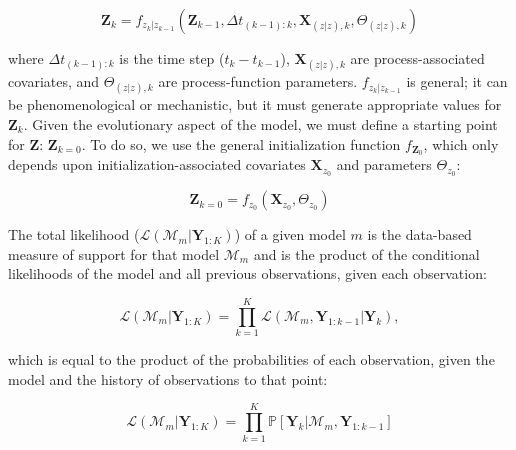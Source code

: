 \documentclass{article}
\begin{document}
\begin{equation}
\textbf{Z}_{k} = f_{z_k|z_{k-1}}(\textbf{Z}_{k-1}, \Delta t_{(k-1):k}, \textbf{X}_{(z|z), k},\Theta_{(z|z), k})
\end{equation}

where $\Delta t_{(k-1):k}$ is the time step ($t_k - t_{k-1}$), $\textbf{X}_{(z|z), k}$ are process-associated covariates, and $\Theta_{(z|z), k}$ are process-function parameters. $f_{z_k|z_{k-1}}$ is general; it can be phenomenological or mechanistic, but it must generate appropriate values for $\textbf{Z}_{k}$. Given the evolutionary aspect of the model, we must define a starting point for $\textbf{Z}$: $\textbf{Z}_{k=0}$. To do so, we use the general initialization function $f_{\textbf{Z}_0}$, which only depends upon initialization-associated covariates $\textbf{X}_{z_0}$ and parameters $\Theta_{z_0}$:

\begin{equation}
\textbf{Z}_{k=0} = f_{z_0}(\textbf{X}_{z_0}, \Theta_{z_0})
\end{equation}

The total likelihood ($\mathcal{L}(\mathcal{M}_m|\textbf{Y}_{1:K})$) of a given model $m$ is the data-based measure of support for that model $\mathcal{M}_m$ and is the product of the conditional likelihoods of the model and all previous observations, given each observation:

\begin{equation}
\mathcal{L}(\mathcal{M}_m|\textbf{Y}_{1:K}) = \prod_{k = 1}^{K}{\mathcal{L}(\mathcal{M}_m, \textbf{Y}_{1:k-1}|\textbf{Y}_{k})},
\end{equation}

which is equal to the product of the probabilities of each observation, given the model and the history of observations to that point:

\begin{equation}
\mathcal{L}(\mathcal{M}_m|\textbf{Y}_{1:K}) = \prod_{k = 1}^{K}{\mathbb{P}[\textbf{Y}_{k}|\mathcal{M}_m, \textbf{Y}_{1:k-1}]}
\end{equation}


  
\end{document}
